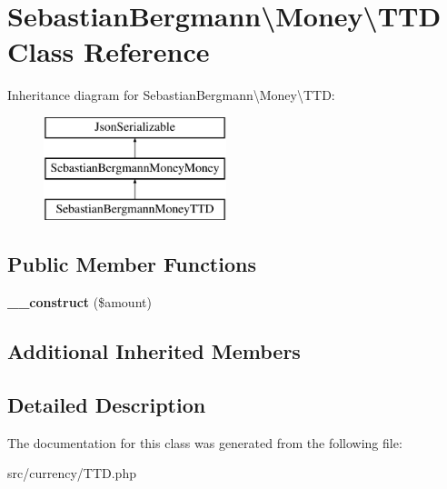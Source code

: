 \hypertarget{classSebastianBergmann_1_1Money_1_1TTD}{}\section{Sebastian\+Bergmann\textbackslash{}Money\textbackslash{}T\+T\+D Class Reference}
\label{classSebastianBergmann_1_1Money_1_1TTD}
Inheritance diagram for Sebastian\+Bergmann\textbackslash{}Money\textbackslash{}T\+T\+D\+:\begin{figure}[H]
\begin{center}
\leavevmode
\includegraphics[height=3.000000cm]{classSebastianBergmann_1_1Money_1_1TTD}
\end{center}
\end{figure}
\subsection*{Public Member Functions}
\begin{DoxyCompactItemize}
\item 
\hypertarget{classSebastianBergmann_1_1Money_1_1TTD_abad9ae19849fefa4b7d052af16aea28b}{}{\bfseries \+\_\+\+\_\+construct} (\$amount)\label{classSebastianBergmann_1_1Money_1_1TTD_abad9ae19849fefa4b7d052af16aea28b}

\end{DoxyCompactItemize}
\subsection*{Additional Inherited Members}


\subsection{Detailed Description}


The documentation for this class was generated from the following file\+:\begin{DoxyCompactItemize}
\item 
src/currency/T\+T\+D.\+php\end{DoxyCompactItemize}
